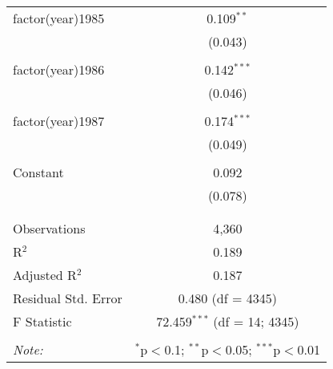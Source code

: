 \begin{table}[!htbp]
\begin{tabular}{@{\extracolsep{5pt}}lc}
 factor(year)1985 & 0.109$^{**}$ \\ 
  & (0.043) \\ 
  & \\ 
 factor(year)1986 & 0.142$^{***}$ \\ 
  & (0.046) \\ 
  & \\ 
 factor(year)1987 & 0.174$^{***}$ \\ 
  & (0.049) \\ 
  & \\ 
 Constant & 0.092 \\ 
  & (0.078) \\ 
  & \\ 
\hline \\[-1.8ex] 
Observations & 4,360 \\ 
R$^{2}$ & 0.189 \\ 
Adjusted R$^{2}$ & 0.187 \\ 
Residual Std. Error & 0.480 (df = 4345) \\ 
F Statistic & 72.459$^{***}$ (df = 14; 4345) \\ 
\hline 
\hline \\[-1.8ex] 
\textit{Note:}  & \multicolumn{1}{r}{$^{*}$p$<$0.1; $^{**}$p$<$0.05; $^{***}$p$<$0.01} \\ 
\end{tabular} 
\end{table} 
